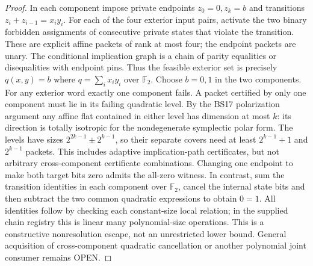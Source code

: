 \documentclass[11pt]{article}
\begin{document}
\begin{proof}
In each component impose private endpoints $z_0=0,z_k=b$ and transitions $z_i+z_{i-1}=x_i y_i$. For each of the four exterior input pairs, activate the two binary forbidden assignments of consecutive private states that violate the transition. These are explicit affine packets of rank at most four; the endpoint packets are unary. The conditional implication graph is a chain of parity equalities or disequalities with endpoint pins. Thus the feasible exterior set is precisely $q(x,y)=b$ where $q=\sum_i x_i y_i$ over $\mathbb F_2$. Choose $b=0,1$ in the two components. For any exterior word exactly one component fails. A packet certified by only one component must lie in its failing quadratic level. By the BS17 polarization argument any affine flat contained in either level has dimension at most $k$: its direction is totally isotropic for the nondegenerate symplectic polar form. The levels have sizes $2^{2k-1}\pm2^{k-1}$, so their separate covers need at least $2^{k-1}+1$ and $2^{k-1}$ packets. This includes adaptive implication-path certificates, but not arbitrary cross-component certificate combinations. Changing one endpoint to make both target bits zero admits the all-zero witness. In contrast, sum the transition identities in each component over $\mathbb F_2$, cancel the internal state bits and then subtract the two common quadratic expressions to obtain $0=1$. All identities follow by checking each constant-size local relation; in the supplied chain registry this is linear many polynomial-size operations. This is a constructive nonresolution escape, not an unrestricted lower bound. General acquisition of cross-component quadratic cancellation or another polynomial joint consumer remains OPEN.
\end{proof}
\end{document}
